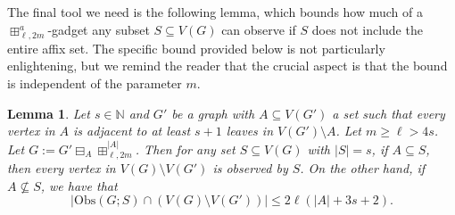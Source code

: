 \documentclass{article}
\newtheorem{lemma}[theorem]{Lemma}
\begin{document}
        The final tool we need is the following lemma, which bounds how much of a $\boxplus^{a}_{\ell,2m}$-gadget any subset $S\subseteq V(G)$ can observe if $S$ does not include the entire affix set.
        The specific bound provided below is not particularly enlightening, but we remind the reader that the crucial aspect is that the bound is independent of the parameter $m$.
        \begin{lemma}\label{lemma bounded observence in grids}
            Let $s\in \mathbb{N}$ and $G'$ be a graph with $A\subseteq V(G')$ a set such that every vertex in $A$ is adjacent to at least $s+1$ leaves in $V(G')\setminus A$.
            Let $m\geq \ell>4s$.
            Let $G:=G'\boxminus_A\boxplus_{\ell,2m}^{|A|}$.
            Then for any set $S\subseteq V(G)$ with $|S|=s$, if $A\subseteq S$, then every vertex in $V(G)\setminus V(G')$ is observed by $S$.
            On the other hand,
            if $A\not\subseteq S$,
            we have that
            \[ |\mathrm{Obs}(G;S)\cap (V(G)\setminus V(G'))|\leq 2\ell(|A|+3s+2). \]
            
        \end{lemma}
\end{document}
